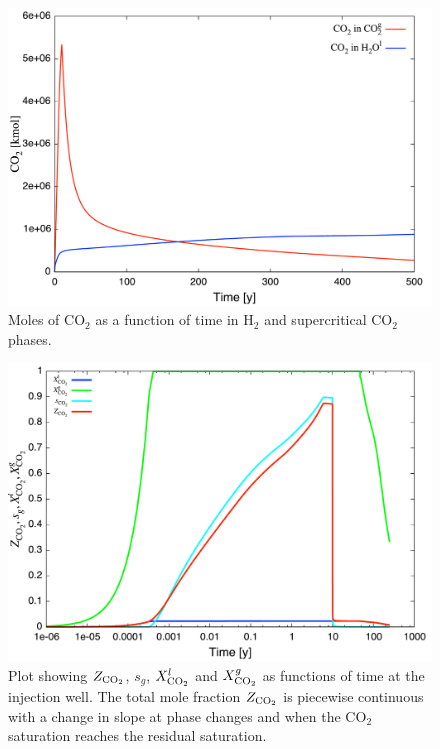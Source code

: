 \documentclass[12pt]{article}
\renewcommand{\c}{{\rm CO_2}}
\begin{document}
\begin{figure}\centering
\includegraphics[scale=0.45]{./figs/mass}
\caption{Moles of CO$_2$ as a function of time in H$_2$ and supercritical CO$_2$ phases.}\label{fmass}
\end{figure}

\begin{figure}\centering
\includegraphics[scale=0.45]{./figs/zco2}
\caption{Plot showing $Z_\c$, $s_g$, $X_\c^l$ and $X_\c^g$ as functions of time at the injection well. The total mole fraction $Z_\c$ is piecewise continuous with a change in slope at phase changes and when the CO$_2$ saturation reaches the residual saturation.}\label{fzco2}
\end{figure}

\newpage
\end{document}
